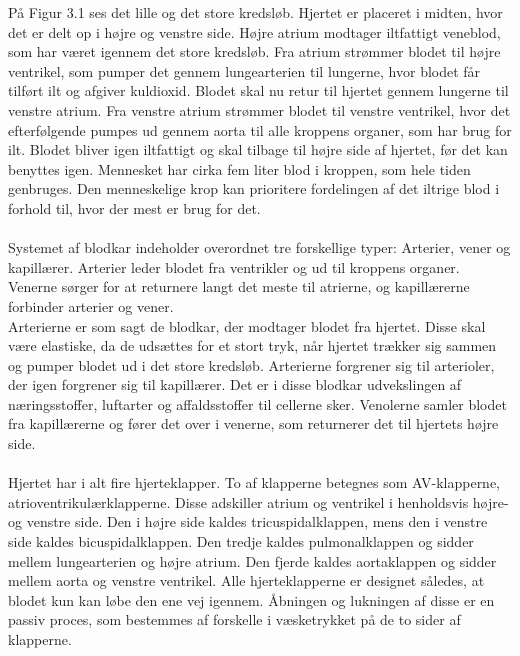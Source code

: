 På Figur 3.1 ses det lille og det store kredsløb. Hjertet er placeret i midten, hvor det er delt op i højre og venstre side. Højre atrium modtager iltfattigt veneblod, som har været igennem det store kredsløb. Fra atrium strømmer blodet til højre ventrikel, som pumper det gennem lungearterien til lungerne, hvor blodet får tilført ilt og afgiver kuldioxid. Blodet skal nu retur til hjertet gennem lungerne til venstre atrium. Fra venstre atrium strømmer blodet til venstre ventrikel, hvor det efterfølgende pumpes ud gennem aorta til alle kroppens organer, som har brug for ilt. Blodet bliver igen iltfattigt og skal tilbage til højre side af hjertet, før det kan benyttes igen. Mennesket har cirka fem liter blod i kroppen, som hele tiden genbruges. Den menneskelige krop kan prioritere fordelingen af det iltrige blod i forhold til, hvor der mest er brug for det. 
\\ \\
Systemet af blodkar indeholder overordnet tre forskellige typer: Arterier, vener og kapillærer. Arterier leder blodet fra ventrikler og ud til kroppens organer. Venerne sørger for at returnere langt det meste til atrierne, og kapillærerne forbinder arterier og vener. 
 \\
Arterierne er som sagt de blodkar, der modtager blodet fra hjertet. Disse skal være elastiske, da de udsættes for et stort tryk, når hjertet trækker sig sammen og pumper blodet ud i det store kredsløb. Arterierne forgrener sig til arterioler, der igen forgrener sig til kapillærer. Det er i disse blodkar udvekslingen af næringsstoffer, luftarter og affaldsstoffer til cellerne sker. Venolerne samler blodet fra kapillærerne og fører det over i venerne, som returnerer det til hjertets højre side.
\\ \\
Hjertet har i alt fire hjerteklapper. To af klapperne betegnes som AV-klapperne, atrioventrikulærklapperne. Disse adskiller atrium og ventrikel i henholdsvis højre- og venstre side. Den i højre side kaldes tricuspidalklappen, mens den i venstre side kaldes bicuspidalklappen. Den tredje kaldes pulmonalklappen og sidder mellem lungearterien og højre atrium. Den fjerde kaldes aortaklappen og sidder mellem aorta og venstre ventrikel. Alle hjerteklapperne er designet således, at blodet kun kan løbe den ene vej igennem. Åbningen og lukningen af disse er en passiv proces, som bestemmes af forskelle i væsketrykket på de to sider af klapperne. 


